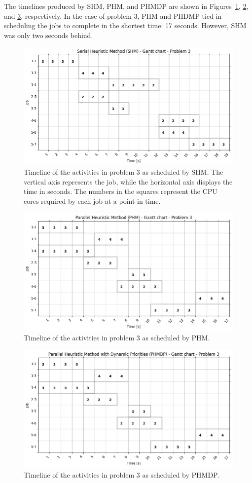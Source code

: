 The timelines produced by SHM, PHM, and PHMDP are shown in Figures~\ref{Figure:comparison->problem->3->timelines->shm}, \ref{Figure:comparison->problem->3->timelines->phm}, and \ref{Figure:comparison->problem->3->timelines->phmdp}, respectively.
In the case of problem 3, PHM and PHDMP tied in scheduling the jobs to complete in the shortest time: 17 seconds.
However, SHM was only two seconds behind.

\begin{figure}[ht!]
	\centering
	\includegraphics[width=0.8\linewidth]{images/comparison/shm_problem_3.png}
	\caption{Timeline of the activities in problem 3 as scheduled by SHM.
		The vertical axis represents the job, while the horizontal axis displays the time in seconds.
		The numbers in the squares represent the CPU cores required by each job at a point in time.
	}
	\label{Figure:comparison->problem->3->timelines->shm}
\end{figure}

\begin{figure}[ht!]
	\centering
	\includegraphics[width=0.8\linewidth]{images/comparison/phm_problem_3.png}
	\caption{Timeline of the activities in problem 3 as scheduled by PHM.}
	\label{Figure:comparison->problem->3->timelines->phm}
\end{figure}

\begin{figure}[ht!]
	\centering
	\includegraphics[width=0.8\linewidth]{images/comparison/phmdp_problem_3.png}
	\caption{Timeline of the activities in problem 3 as scheduled by PHMDP.}
	\label{Figure:comparison->problem->3->timelines->phmdp}
\end{figure}